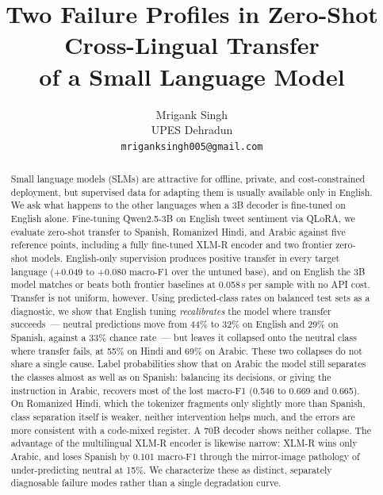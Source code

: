 \documentclass[11pt]{article}
\title{Two Failure Profiles in Zero-Shot Cross-Lingual Transfer\\
of a Small Language Model}
\author{Mrigank Singh \\
  UPES Dehradun \\
  \texttt{mriganksingh005@gmail.com}}
\begin{document}
\maketitle

\raggedbottom

\begin{abstract}
Small language models (SLMs) are attractive for offline, private, and
cost-constrained deployment, but supervised data for adapting them is usually
available only in English. We ask what happens to the other languages when a 3B
decoder is fine-tuned on English alone. Fine-tuning Qwen2.5-3B on English tweet
sentiment via QLoRA, we evaluate zero-shot transfer to Spanish, Romanized Hindi,
and Arabic against five reference points, including a fully fine-tuned \mbox{XLM-R}
encoder and two frontier zero-shot models. English-only supervision produces
positive transfer in every target language (\mbox{+0.049} to \mbox{+0.080}
macro-F1 over the untuned base), and on English the 3B model matches or beats both
frontier baselines at 0.058\,s per sample with no API cost. Transfer is not
uniform, however. Using predicted-class rates on balanced test sets as a
diagnostic, we show that English tuning \emph{recalibrates} the model where
transfer succeeds~--- neutral predictions move from 44\% to 32\% on English and
29\% on Spanish, against a 33\% chance rate~--- but leaves it collapsed onto the
neutral class where transfer fails, at 55\% on Hindi and 69\% on Arabic. These two
collapses do not share a single cause. Label probabilities show that on Arabic the
model still separates the classes almost as well as on Spanish: balancing its
decisions, or giving the instruction in Arabic, recovers most of the lost
macro-F1 (0.546 to 0.669 and 0.665). On Romanized Hindi, which the tokenizer
fragments only slightly more than Spanish, class separation itself is weaker,
neither intervention helps much, and the errors are more consistent with a
code-mixed register. A 70B decoder shows neither collapse. The advantage of the
multilingual \mbox{XLM-R} encoder is likewise narrow: \mbox{XLM-R} wins only Arabic, and loses Spanish by 0.101 macro-F1
through the mirror-image pathology of under-predicting neutral at 15\%. We
characterize these as distinct, separately diagnosable failure modes rather than a
single degradation curve.
\end{abstract}
\end{document}
